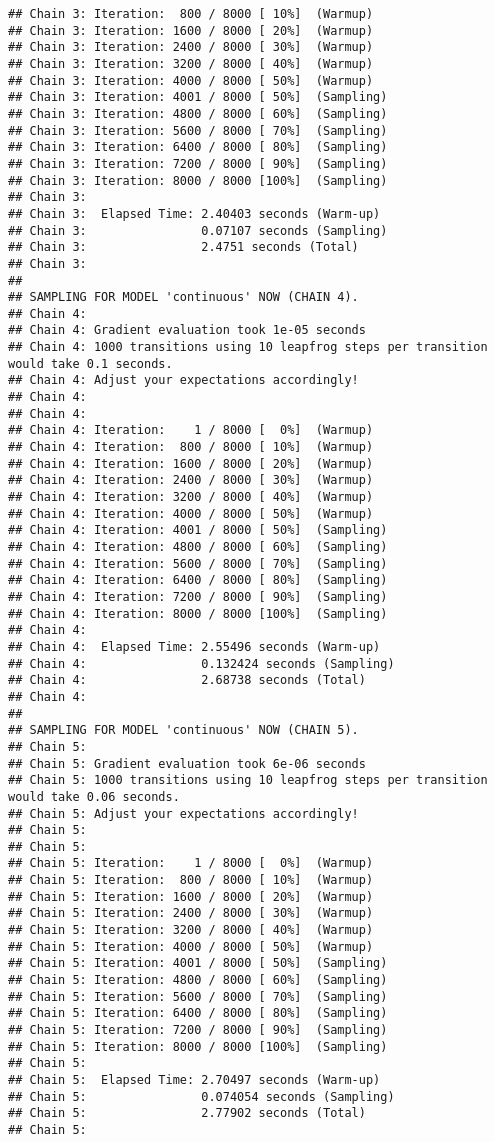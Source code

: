 \documentclass[
]{article}
\begin{document}
\begin{verbatim}
## Chain 3: Iteration:  800 / 8000 [ 10%]  (Warmup)
## Chain 3: Iteration: 1600 / 8000 [ 20%]  (Warmup)
## Chain 3: Iteration: 2400 / 8000 [ 30%]  (Warmup)
## Chain 3: Iteration: 3200 / 8000 [ 40%]  (Warmup)
## Chain 3: Iteration: 4000 / 8000 [ 50%]  (Warmup)
## Chain 3: Iteration: 4001 / 8000 [ 50%]  (Sampling)
## Chain 3: Iteration: 4800 / 8000 [ 60%]  (Sampling)
## Chain 3: Iteration: 5600 / 8000 [ 70%]  (Sampling)
## Chain 3: Iteration: 6400 / 8000 [ 80%]  (Sampling)
## Chain 3: Iteration: 7200 / 8000 [ 90%]  (Sampling)
## Chain 3: Iteration: 8000 / 8000 [100%]  (Sampling)
## Chain 3: 
## Chain 3:  Elapsed Time: 2.40403 seconds (Warm-up)
## Chain 3:                0.07107 seconds (Sampling)
## Chain 3:                2.4751 seconds (Total)
## Chain 3: 
## 
## SAMPLING FOR MODEL 'continuous' NOW (CHAIN 4).
## Chain 4: 
## Chain 4: Gradient evaluation took 1e-05 seconds
## Chain 4: 1000 transitions using 10 leapfrog steps per transition would take 0.1 seconds.
## Chain 4: Adjust your expectations accordingly!
## Chain 4: 
## Chain 4: 
## Chain 4: Iteration:    1 / 8000 [  0%]  (Warmup)
## Chain 4: Iteration:  800 / 8000 [ 10%]  (Warmup)
## Chain 4: Iteration: 1600 / 8000 [ 20%]  (Warmup)
## Chain 4: Iteration: 2400 / 8000 [ 30%]  (Warmup)
## Chain 4: Iteration: 3200 / 8000 [ 40%]  (Warmup)
## Chain 4: Iteration: 4000 / 8000 [ 50%]  (Warmup)
## Chain 4: Iteration: 4001 / 8000 [ 50%]  (Sampling)
## Chain 4: Iteration: 4800 / 8000 [ 60%]  (Sampling)
## Chain 4: Iteration: 5600 / 8000 [ 70%]  (Sampling)
## Chain 4: Iteration: 6400 / 8000 [ 80%]  (Sampling)
## Chain 4: Iteration: 7200 / 8000 [ 90%]  (Sampling)
## Chain 4: Iteration: 8000 / 8000 [100%]  (Sampling)
## Chain 4: 
## Chain 4:  Elapsed Time: 2.55496 seconds (Warm-up)
## Chain 4:                0.132424 seconds (Sampling)
## Chain 4:                2.68738 seconds (Total)
## Chain 4: 
## 
## SAMPLING FOR MODEL 'continuous' NOW (CHAIN 5).
## Chain 5: 
## Chain 5: Gradient evaluation took 6e-06 seconds
## Chain 5: 1000 transitions using 10 leapfrog steps per transition would take 0.06 seconds.
## Chain 5: Adjust your expectations accordingly!
## Chain 5: 
## Chain 5: 
## Chain 5: Iteration:    1 / 8000 [  0%]  (Warmup)
## Chain 5: Iteration:  800 / 8000 [ 10%]  (Warmup)
## Chain 5: Iteration: 1600 / 8000 [ 20%]  (Warmup)
## Chain 5: Iteration: 2400 / 8000 [ 30%]  (Warmup)
## Chain 5: Iteration: 3200 / 8000 [ 40%]  (Warmup)
## Chain 5: Iteration: 4000 / 8000 [ 50%]  (Warmup)
## Chain 5: Iteration: 4001 / 8000 [ 50%]  (Sampling)
## Chain 5: Iteration: 4800 / 8000 [ 60%]  (Sampling)
## Chain 5: Iteration: 5600 / 8000 [ 70%]  (Sampling)
## Chain 5: Iteration: 6400 / 8000 [ 80%]  (Sampling)
## Chain 5: Iteration: 7200 / 8000 [ 90%]  (Sampling)
## Chain 5: Iteration: 8000 / 8000 [100%]  (Sampling)
## Chain 5: 
## Chain 5:  Elapsed Time: 2.70497 seconds (Warm-up)
## Chain 5:                0.074054 seconds (Sampling)
## Chain 5:                2.77902 seconds (Total)
## Chain 5:
\end{verbatim}
\end{document}
